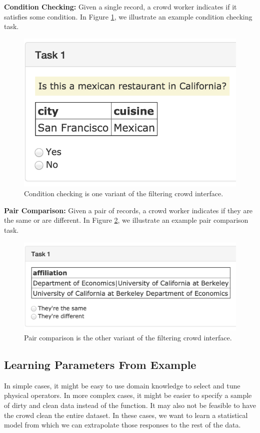 \noindent\textbf{Condition Checking: } Given a single record, a crowd worker indicates if it satisfies some condition. In Figure \ref{fig:condition},
we illustrate an example condition checking task.
\begin{figure}[ht!]
\centering
\includegraphics[scale=0.25]{figs/condition.png}
\caption{Condition checking is one variant of the filtering crowd interface.\label{fig:condition}}\vspace{-.5em}
\end{figure}

\noindent\textbf{Pair Comparison: } Given a pair of records, a crowd worker indicates if they are the same or are different. In Figure \ref{fig:pair},
we illustrate an example pair comparison task.

\begin{figure}[ht!]
\centering
\includegraphics[scale=0.25]{figs/pair.png}
\caption{Pair comparison is the other variant of the filtering crowd interface.\label{fig:pair}}\vspace{-.5em}
\end{figure}

\subsection{Learning Parameters From Example}
In simple cases, it might be easy to use domain knowledge to select and tune physical operators. 
In more complex cases, it might be easier to specify a sample of dirty and clean data instead of the function.
It may also not be feasible to have the crowd clean the entire dataset.
In these cases, we want to learn a statistical model from which we can extrapolate those responses to the rest 
of the data.

